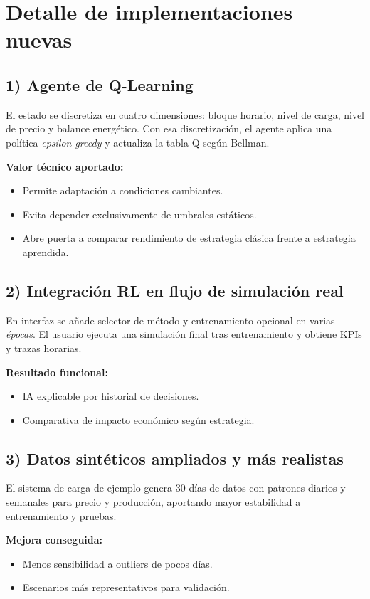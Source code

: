 \documentclass[12pt,a4paper]{article}
\begin{document}
\section{Detalle de implementaciones nuevas}
\subsection{1) Agente de Q-Learning}
El estado se discretiza en cuatro dimensiones: bloque horario, nivel de carga, nivel de precio y balance energ\'etico. Con esa discretizaci\'on, el agente aplica una pol\'itica \textit{epsilon-greedy} y actualiza la tabla Q seg\'un Bellman.

\textbf{Valor t\'ecnico aportado:}
\begin{itemize}
    \item Permite adaptaci\'on a condiciones cambiantes.
    \item Evita depender exclusivamente de umbrales est\'aticos.
    \item Abre puerta a comparar rendimiento de estrategia cl\'asica frente a estrategia aprendida.
\end{itemize}

\subsection{2) Integraci\'on RL en flujo de simulaci\'on real}
En interfaz se a\~nade selector de m\'etodo y entrenamiento opcional en varias \textit{\'epocas}. El usuario ejecuta una simulaci\'on final tras entrenamiento y obtiene KPIs y trazas horarias.

\textbf{Resultado funcional:}
\begin{itemize}
    \item IA explicable por historial de decisiones.
    \item Comparativa de impacto econ\'omico seg\'un estrategia.
\end{itemize}

\subsection{3) Datos sint\'eticos ampliados y m\'as realistas}
El sistema de carga de ejemplo genera 30 d\'ias de datos con patrones diarios y semanales para precio y producci\'on, aportando mayor estabilidad a entrenamiento y pruebas.

\textbf{Mejora conseguida:}
\begin{itemize}
    \item Menos sensibilidad a outliers de pocos d\'ias.
    \item Escenarios m\'as representativos para validaci\'on.
\end{itemize}
\end{document}
